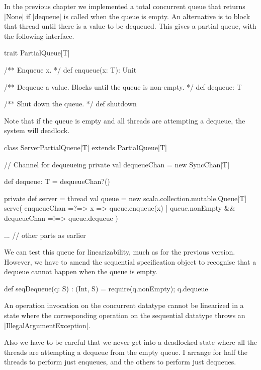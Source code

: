 

\begin{slide}

In the previous chapter we implemented a total concurrent queue that returns
|None| if |dequeue| is called when the queue is empty.  
%
An alternative is to block that thread until there is a value to be dequeued.
This gives a partial queue, with the following interface.

\begin{scala}
trait PartialQueue[T]{
  /** Enqueue x. */
  def enqueue(x: T): Unit

  /** Dequeue a value.  Blocks until the queue is non-empty. */
  def dequeue: T

  /** Shut down the queue. */
  def shutdown
}
\end{scala}
Note that if the queue is empty and all threads are attempting a dequeue, the
system will deadlock. 
\end{slide}


\begin{slide}

\begin{scala}
class ServerPartialQueue[T] extends PartialQueue[T]{
  // Channel for dequeueing
  private val dequeueChan = new SyncChan[T]

  def dequeue: T = dequeueChan?()

  private def server = thread{
    val queue = new scala.collection.mutable.Queue[T]
    serve(
      enqueueChan =?=> { x => queue.enqueue(x) }
      | queue.nonEmpty && dequeueChan =!=> queue.dequeue
    )
  }

  ... // other parts as earlier
}
\end{scala}
\end{slide}


\begin{slide}

We can test this queue for linearizability, much as for the previous version.
However, we have to amend the sequential specification object to recognise
that a dequeue cannot happen when the queue is empty. 
\begin{scala}
  def seqDequeue(q: S) : (Int, S) = {
    require(q.nonEmpty); q.dequeue
  }
\end{scala}
An operation invocation on the concurrent datatype cannot be linearized in a
state where the corresponding operation on the sequential datatype throws an
|IllegalArgumentException|.

Also we have to be careful that we never get into a deadlocked state where all
the threads are attempting a dequeue from the empty queue.  I arrange for half
the threads to perform just enqueues, and the others to perform just dequeues.  
\end{slide}

